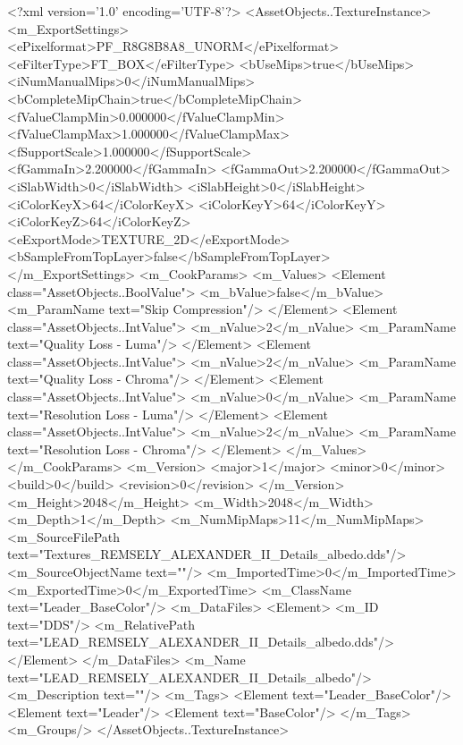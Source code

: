 <?xml version='1.0' encoding='UTF-8'?>
<AssetObjects..TextureInstance>
  <m_ExportSettings>
    <ePixelformat>PF_R8G8B8A8_UNORM</ePixelformat>
    <eFilterType>FT_BOX</eFilterType>
    <bUseMips>true</bUseMips>
    <iNumManualMips>0</iNumManualMips>
    <bCompleteMipChain>true</bCompleteMipChain>
    <fValueClampMin>0.000000</fValueClampMin>
    <fValueClampMax>1.000000</fValueClampMax>
    <fSupportScale>1.000000</fSupportScale>
    <fGammaIn>2.200000</fGammaIn>
    <fGammaOut>2.200000</fGammaOut>
    <iSlabWidth>0</iSlabWidth>
    <iSlabHeight>0</iSlabHeight>
    <iColorKeyX>64</iColorKeyX>
    <iColorKeyY>64</iColorKeyY>
    <iColorKeyZ>64</iColorKeyZ>
    <eExportMode>TEXTURE_2D</eExportMode>
    <bSampleFromTopLayer>false</bSampleFromTopLayer>
  </m_ExportSettings>
  <m_CookParams>
    <m_Values>
      <Element class="AssetObjects..BoolValue">
        <m_bValue>false</m_bValue>
        <m_ParamName text="Skip Compression"/>
      </Element>
      <Element class="AssetObjects..IntValue">
        <m_nValue>2</m_nValue>
        <m_ParamName text="Quality Loss - Luma"/>
      </Element>
      <Element class="AssetObjects..IntValue">
        <m_nValue>2</m_nValue>
        <m_ParamName text="Quality Loss - Chroma"/>
      </Element>
      <Element class="AssetObjects..IntValue">
        <m_nValue>0</m_nValue>
        <m_ParamName text="Resolution Loss - Luma"/>
      </Element>
      <Element class="AssetObjects..IntValue">
        <m_nValue>2</m_nValue>
        <m_ParamName text="Resolution Loss - Chroma"/>
      </Element>
    </m_Values>
  </m_CookParams>
  <m_Version>
    <major>1</major>
    <minor>0</minor>
    <build>0</build>
    <revision>0</revision>
  </m_Version>
  <m_Height>2048</m_Height>
  <m_Width>2048</m_Width>
  <m_Depth>1</m_Depth>
  <m_NumMipMaps>11</m_NumMipMaps>
  <m_SourceFilePath text="Textures\LEAD_REMSELY_ALEXANDER_II_Details_albedo.dds"/>
  <m_SourceObjectName text=""/>
  <m_ImportedTime>0</m_ImportedTime>
  <m_ExportedTime>0</m_ExportedTime>
  <m_ClassName text="Leader_BaseColor"/>
  <m_DataFiles>
    <Element>
      <m_ID text="DDS"/>
      <m_RelativePath text="LEAD_REMSELY_ALEXANDER_II_Details_albedo.dds"/>
    </Element>
  </m_DataFiles>
  <m_Name text="LEAD_REMSELY_ALEXANDER_II_Details_albedo"/>
  <m_Description text=""/>
  <m_Tags>
    <Element text="Leader_BaseColor"/>
    <Element text="Leader"/>
    <Element text="BaseColor"/>
  </m_Tags>
  <m_Groups/>
</AssetObjects..TextureInstance>
